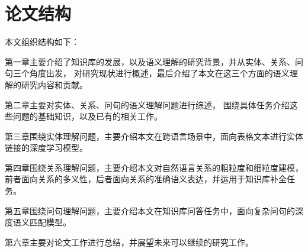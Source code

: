 \section{论文结构}

本文组织结构如下：

第一章主要介绍了知识库的发展，以及语义理解的研究背景，并从实体、关系、问句三个角度出发，
对研究现状进行概述，最后介绍了本文在这三个方面的语义理解的研究内容和贡献。

第二章主要对实体、关系、问句的语义理解问题进行综述，
围绕具体任务介绍这些问题的基础知识，以及已有的相关工作。

第三章围绕实体理解问题，主要介绍本文在跨语言场景中，面向表格文本进行实体链接的深度学习模型。

第四章围绕关系理解问题，主要介绍本文对自然语言关系的粗粒度和细粒度建模，
前者面向关系的多义性，后者面向关系的准确语义表达，并运用于知识库补全任务。

第五章围绕问句理解问题，主要介绍本文在知识库问答任务中，面向复杂问句的深度语义匹配模型。

第六章主要对论文工作进行总结，并展望未来可以继续的研究工作。

